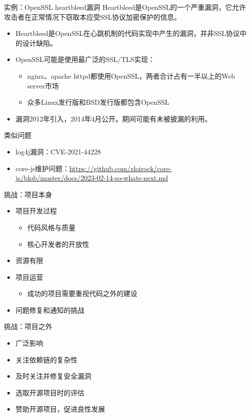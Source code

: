 \documentclass{beamer}
\begin{document}
\begin{frame}[label={sec:org6714fa2}]{实例：OpenSSL heartbleed漏洞}
Heartbleed是OpenSSL的一个严重漏洞，它允许攻击者在正常情况下窃取本应受SSL协议加密保护的信息。
\begin{itemize}
\item Heartbleed是OpenSSL在心跳机制的代码实现中产生的漏洞，并非SSL协议中的设计缺陷。
\item OpenSSL可能是使用最广泛的SSL/TLS实现：
\begin{itemize}
\item nginx、apache httpd都使用OpenSSL，两者合计占有一半以上的Web server市场
\item 众多Linux发行版和BSD发行版都包含OpenSSL
\end{itemize}
\item 漏洞2012年引入，2014年4月公开。期间可能有未被披漏的利用。
\end{itemize}

类似问题
\begin{itemize}
\item log4j漏洞：CVE-2021-44228
\item core-js维护问题：\url{https://github.com/zloirock/core-js/blob/master/docs/2023-02-14-so-whats-next.md}
\end{itemize}
\end{frame}

\begin{frame}[label={sec:org3225c3e}]{挑战：项目本身}
\begin{itemize}
\item 项目开发过程
\begin{itemize}
\item 代码风格与质量
\item 核心开发者的开放性
\end{itemize}
\item 资源有限
\item 项目运营
\begin{itemize}
\item 成功的项目需要重视代码之外的建设
\end{itemize}
\item 问题修复和通知的挑战
\end{itemize}
\end{frame}

\begin{frame}[label={sec:org40d9e20}]{挑战：项目之外}
\begin{itemize}
\item 广泛影响
\item 关注依赖链的复杂性
\item 及时关注并修复安全漏洞
\item 选取开源项目时的评估
\item 赞助开源项目，促进良性发展
\end{itemize}
\end{frame}
\end{document}
